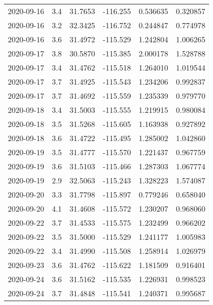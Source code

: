 \begin{tabular}{lrrrrr}
2020-09-16 &       3.4 &  31.7653 &  -116.255 &         0.536635 &         0.320857 \\
2020-09-16 &       3.2 &  32.3425 &  -116.752 &         0.244847 &         0.774978 \\
2020-09-16 &       3.6 &  31.4972 &  -115.529 &         1.242804 &         1.006265 \\
2020-09-17 &       3.8 &  30.5870 &  -115.385 &         2.000178 &         1.528788 \\
2020-09-17 &       3.4 &  31.4762 &  -115.518 &         1.264010 &         1.019544 \\
2020-09-17 &       3.7 &  31.4925 &  -115.543 &         1.234206 &         0.992837 \\
2020-09-17 &       3.7 &  31.4692 &  -115.559 &         1.235339 &         0.979770 \\
2020-09-18 &       3.4 &  31.5003 &  -115.555 &         1.219915 &         0.980084 \\
2020-09-18 &       3.5 &  31.5268 &  -115.605 &         1.163938 &         0.927892 \\
2020-09-18 &       3.6 &  31.4722 &  -115.495 &         1.285002 &         1.042860 \\
2020-09-19 &       3.5 &  31.4777 &  -115.570 &         1.221437 &         0.967759 \\
2020-09-19 &       3.6 &  31.5103 &  -115.466 &         1.287303 &         1.067774 \\
2020-09-19 &       2.9 &  32.5063 &  -115.243 &         1.328223 &         1.574087 \\
2020-09-20 &       3.3 &  31.7798 &  -115.897 &         0.779246 &         0.658040 \\
2020-09-20 &       4.1 &  31.4608 &  -115.572 &         1.230207 &         0.968060 \\
2020-09-22 &       3.7 &  31.4533 &  -115.575 &         1.232499 &         0.966202 \\
2020-09-22 &       3.5 &  31.5000 &  -115.529 &         1.241177 &         1.005983 \\
2020-09-22 &       3.4 &  31.4990 &  -115.508 &         1.258914 &         1.026979 \\
2020-09-23 &       3.6 &  31.4762 &  -115.622 &         1.181509 &         0.916401 \\
2020-09-24 &       3.6 &  31.5162 &  -115.535 &         1.226931 &         0.998523 \\
2020-09-24 &       3.7 &  31.4848 &  -115.541 &         1.240371 &         0.995687 \\

\end{tabular}
